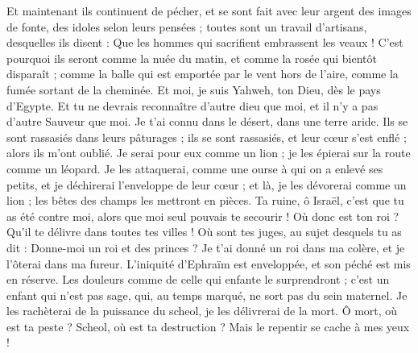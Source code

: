 \begin{multicols}{2}
Et maintenant ils continuent de pécher, et se sont fait avec leur argent des images de fonte, des idoles selon leurs pensées ; toutes sont un travail d'artisans, desquelles ils disent : Que les hommes qui sacrifient embrassent les veaux !
C'est pourquoi ils seront comme la nuée du matin, et comme la rosée qui bientôt disparaît ; comme la balle qui est emportée par le vent hors de l'aire, comme la fumée sortant de la cheminée.
Et moi, je suis Yahweh, ton Dieu, dès le pays d'Egypte. Et tu ne devrais reconnaître d'autre dieu que moi, et il n'y a pas d'autre Sauveur que moi.
Je t'ai connu dans le désert, dans une terre aride.
Ils se sont rassasiés dans leurs pâturages ; ils se sont rassasiés, et leur cœur s'est enflé ; alors ils m'ont oublié.
Je serai pour eux comme un lion ; je les épierai sur la route comme un léopard.
Je les attaquerai, comme une ourse à qui on a enlevé ses petits, et je déchirerai l'enveloppe de leur cœur ; et là, je les dévorerai comme un lion ; les bêtes des champs les mettront en pièces.
Ta ruine, ô Israël, c'est que tu as été contre moi, alors que moi seul pouvais te secourir !
Où donc est ton roi ? Qu'il te délivre dans toutes tes villes ! Où sont tes juges, au sujet desquels tu as dit : Donne-moi un roi et des princes ?
Je t'ai donné un roi dans ma colère, et je l'ôterai dans ma fureur.
L'iniquité d'Ephraïm est enveloppée, et son péché est mis en réserve.
Les douleurs comme de celle qui enfante le surprendront ; c'est un enfant qui n'est pas sage, qui, au temps marqué, ne sort pas du sein maternel.
Je les rachèterai de la puissance du scheol, je les délivrerai de la mort. Ô mort, où est ta peste ? Scheol, où est ta destruction ? Mais le repentir se cache à mes yeux !

\end{multicols}
